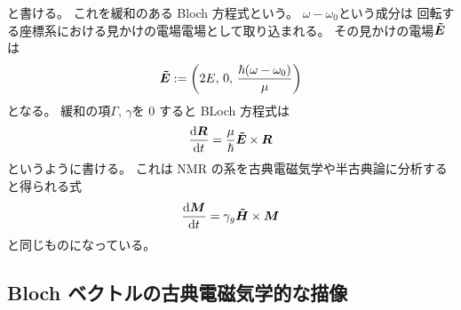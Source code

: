 \documentclass[11pt,dvipdfmx,a4paper]{jsarticle}
\begin{document}
と書ける。
これを緩和のある Bloch 方程式という。
\(\omega-\omega_0\)という成分は
回転する座標系における見かけの電場電場として取り込まれる。
その見かけの電場\({\vb*{\tilde{E}}}\)は
\begin{equation}
	\vb*{\tilde{E}} := \qty(2E,\,0,\,\frac{\hbar(\omega-\omega_0)}{\mu})
\end{equation}
となる。
緩和の項\(\Gamma,\,\gamma\)を 0 すると
BLoch 方程式は
\begin{equation}
	\dv{\vb*{R}}{t} = \frac{\mu}{\hbar}\vb*{\tilde{E}}\times\vb*{R}
\end{equation}
というように書ける。
これは NMR の系を古典電磁気学や半古典論に分析すると得られる式
\begin{equation}
	\dv{\vb*{M}}{t} = \gamma_g \vb*{\tilde{H}} \times \vb*{M}
\end{equation}
と同じものになっている。

\subsection{Bloch ベクトルの古典電磁気学的な描像}



\end{document}
